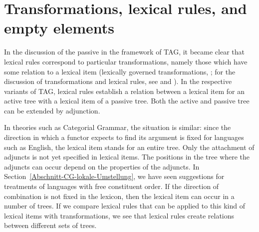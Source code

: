 \section{Transformations, lexical rules, and empty elements}
\label{Abschnitt-leere-Elemente-LRs-Transformations}

In the discussion of the passive in the framework of TAG, it became clear that lexical rules
correspond to particular transformations, namely those which have some relation to a lexical item (lexically governed transformations, \citealp{Dowty78a}; 
for the discussion of transformations and lexical rules, see  and ). In the respective variants of TAG\indextag, lexical rules establish a relation
between a lexical item for an active tree with a lexical item of a passive tree. Both the active and passive tree can be extended by adjunction.

In theories such as Categorial Grammar\indexcg, the situation is similar: since the direction in which a functor expects to find its argument is fixed
for languages such as English, the lexical item stands for an entire tree. Only the attachment of
adjuncts is not yet specified in lexical items. The positions in the
tree where the adjuncts can occur depend on the properties of the adjuncts. In Section~\ref{Abschnitt-CG-lokale-Umstellung},
we have seen suggestions for treatments of languages with free constituent order. If the direction of combination is not fixed in the lexicon, then the lexical item
can occur in a number of trees. If we compare lexical rules that can be applied to this kind of lexical items with transformations, we see that lexical rules create relations
between different sets of trees.

